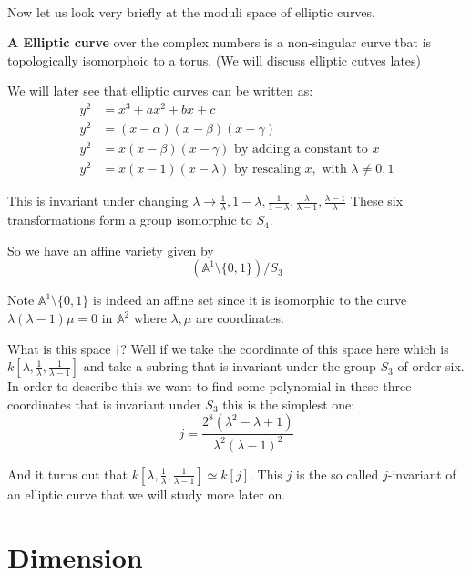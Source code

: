 \

Now let us look very briefly at the moduli space of elliptic curves.

\begin{definition}
    \textbf{A Elliptic curve} over the complex numbers is a non-singular curve tbat is topologically isomorphoic to a torus. (We will discuss elliptic cutves lates)
\end{definition}

We will later see that elliptic curves can be written as:\begin{align*}
    y^2&= x^3+ax^2+bx+c\\
    y^2&= (x-\alpha)(x-\beta)(x-\gamma)\\
    y^2 &= x(x-\beta)(x-\gamma) \text{ by adding a constant to }x\\
    y^2 &= x(x-1)(x-\lambda) \text{ by rescaling }x, \text{ with }\lambda\neq 0,1
\end{align*}

This is invariant under changing $\lambda \rightarrow \frac{1}{\lambda}, 1-\lambda, \frac{1}{1-\lambda}, \frac{\lambda}{\lambda-1}, \frac{\lambda - 1}{\lambda}$
These six transformations form a group isomorphic to $S_4$.

So we have an affine variety given by \begin{equation}
    (\mathbb{A}^1\setminus\{0,1\})/S_3 \tag{$\dagger$}
\end{equation}

Note $\mathbb{A}^1\setminus\{0,1\}$ is indeed an affine set since it is isomorphic to the curve $\lambda(\lambda-1)\mu = 0$ in $\mathbb{A}^2$ where $\lambda,\mu$ are coordinates.

What is this space $\dagger$? Well if we take the coordinate of this space here which is $k[\lambda, \frac{1}{\lambda}, \frac{1}{\lambda-1}]$ and take a subring that is invariant under the group $S_3$ of order six. In order to describe this we want to find some polynomial in these three coordinates
that is invariant under $S_3$ this is the simplest one:\begin{equation}
    j = \frac{2^8(\lambda^2-\lambda+1)}{\lambda^2(\lambda-1)^2}
\end{equation}

And it turns out that $k[\lambda, \frac{1}{\lambda}, \frac{1}{\lambda-1}] \simeq k[j]$. This $j$ is the so called $j$-invariant of an elliptic curve that we will study more later on.

\section{Dimension}
